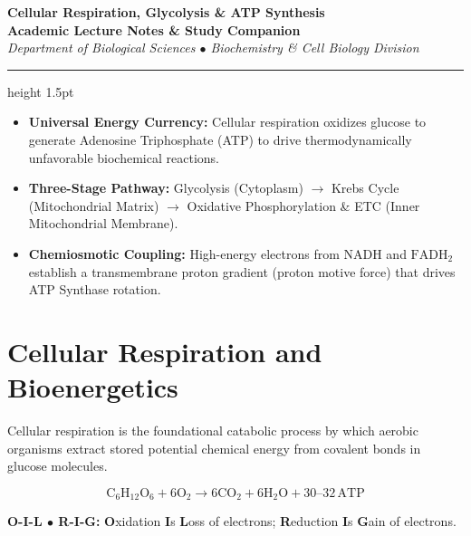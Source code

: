 \documentclass[11pt,a4paper]{article}
\begin{document}
\begin{center}
    {\Huge \textbf{Cellular Respiration, Glycolysis \& ATP Synthesis}}\\[6pt]
    {\large \textbf{Academic Lecture Notes \& Study Companion}}\\[4pt]
    \textit{Department of Biological Sciences $\bullet$ Biochemistry \& Cell Biology Division}
    \vspace{8pt}
    \hrule height 1.5pt
    \vspace{12pt}
\end{center}

\begin{tcolorbox}[title=Core Conceptual Takeaways]
\begin{itemize}[leftmargin=1.5em, itemsep=2pt]
    \item \textbf{Universal Energy Currency:} Cellular respiration oxidizes glucose to generate Adenosine Triphosphate (ATP) to drive thermodynamically unfavorable biochemical reactions.
    \item \textbf{Three-Stage Pathway:} Glycolysis (Cytoplasm) $\rightarrow$ Krebs Cycle (Mitochondrial Matrix) $\rightarrow$ Oxidative Phosphorylation \& ETC (Inner Mitochondrial Membrane).
    \item \textbf{Chemiosmotic Coupling:} High-energy electrons from NADH and $\text{FADH}_2$ establish a transmembrane proton gradient (proton motive force) that drives ATP Synthase rotation.
\end{itemize}
\end{tcolorbox}

\vspace{10pt}

\section{Cellular Respiration and Bioenergetics}

Cellular respiration is the foundational catabolic process by which aerobic organisms extract stored potential chemical energy from covalent bonds in glucose molecules.

\begin{equation*}
    \text{C}_6\text{H}_{12}\text{O}_6 + 6\text{O}_2 \longrightarrow 6\text{CO}_2 + 6\text{H}_2\text{O} + 30\text{--}32\,\text{ATP}
\end{equation*}

\begin{mnemonicbox}
\textbf{O-I-L $\bullet$ R-I-G:} \textbf{O}xidation \textbf{I}s \textbf{L}oss of electrons; \textbf{R}eduction \textbf{I}s \textbf{G}ain of electrons.
\end{mnemonicbox}
\end{document}
